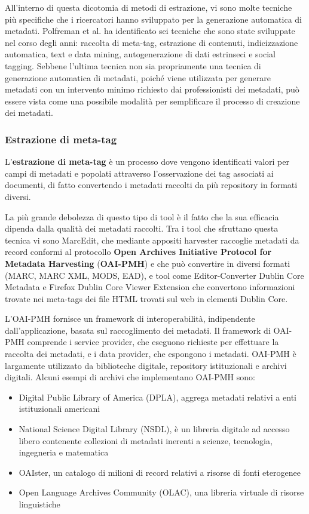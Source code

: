 \vspace{5mm}

All'interno di questa dicotomia di metodi di estrazione, vi sono molte tecniche più specifiche che i ricercatori hanno sviluppato per la generazione automatica di metadati. Polfreman et al. ha identificato sei tecniche che sono state sviluppate nel corso degli anni: raccolta di meta-tag, estrazione di contenuti, indicizzazione automatica, text e data mining, autogenerazione di dati estrinseci e social tagging. Sebbene l'ultima tecnica non sia propriamente una tecnica di generazione automatica di metadati, poiché viene utilizzata per generare metadati con un intervento minimo richiesto dai professionisti dei metadati, può essere vista come una possibile modalità per semplificare il processo di creazione dei metadati\cite{semi}.

\subsubsection{Estrazione di meta-tag}
L'\textbf{estrazione di meta-tag} è un processo dove vengono identificati valori per campi di metadati e popolati attraverso l'osservazione dei tag associati ai documenti, di fatto convertendo i metadati raccolti da più repository in formati diversi.

La più grande debolezza di questo tipo di tool è il fatto che la sua efficacia dipenda dalla qualità dei metadati raccolti.
Tra i tool che sfruttano questa tecnica vi sono MarcEdit, che mediante appositi harvester raccoglie metadati da record conformi al protocollo \textbf{Open Archives Initiative Protocol for Metadata Harvesting} (\textbf{OAI-PMH}) e che può convertire in diversi formati (MARC, MARC XML, MODS, EAD), e tool come Editor-Converter Dublin Core Metadata e Firefox Dublin Core Viewer Extension che convertono informazioni trovate nei meta-tags dei file HTML trovati sul web in elementi Dublin Core.

L'OAI-PMH fornisce un framework di interoperabilità, indipendente dall'applicazione, basata sul raccoglimento dei metadati. Il framework di OAI-PMH comprende i service provider, che eseguono richieste per effettuare la raccolta dei metadati, e i data provider, che espongono i metadati. OAI-PMH è largamente utilizzato da biblioteche digitale, repository istituzionali e archivi digitali\cite{harvesting}. Alcuni esempi di archivi che implementano OAI-PMH sono:

\begin{itemize}
\item Digital Public Library of America (DPLA), aggrega metadati relativi a enti istituzionali americani
\item National Science Digital Library (NSDL), è un libreria digitale ad accesso libero contenente collezioni di metadati inerenti a scienze, tecnologia, ingegneria e matematica
\item OAIster, un catalogo di milioni di record relativi a risorse di fonti eterogenee
\item Open Language Archives Community (OLAC), una libreria virtuale di risorse linguistiche
\end{itemize}


